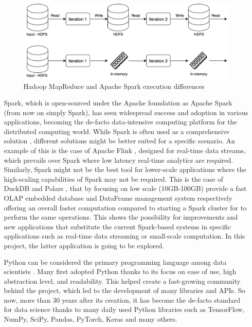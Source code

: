 \begin{figure}[!ht]
    \begin{center}
      \includegraphics[width=\textwidth]{figures/1-introduction/Spark_MapReduce.png}
    \end{center}
    \caption{Hadoop MapReduce and Apache Spark execution differences}
    \label{fig:MapReducevsSpark}
\end{figure}


Spark, which is open-sourced under the Apache foundation as Apache Spark \cite{ApacheSparkUnified} (from now on simply Spark), has seen widespread success and adoption in various applications, becoming the de-facto data-intensive computing platform for the distributed computing world. While Spark is often used as a comprehensive solution \cite{zahariaApacheSparkUnified2016}, different solutions might be better suited for a specific scenario. An example of this is the case of Apache Flink \cite{carboneApacheFlinkStream}, designed for real-time data streams, which prevails over Spark where low latency real-time analytics are required. Similarly, Spark might not be the best tool for lower-scale applications where the high-scaling capabilities of Spark may not be required. This is the case of DuckDB \cite{raasveldtDuckDBEmbeddableAnalytical2019} and Polars \cite{vinkWroteOneFastest2021}, that by focusing on low scale (10GB-100GB) provide a fast \gls{OLAP} embedded database and DataFrame management system respectively offering an overall faster computation compared to starting a Spark cluster for to perform the same operations. This shows the possibility for improvements and new applications that substitute the current Spark-based systems in specific applications such as real-time data streaming or small-scale computation. In this project, the latter application is going to be explored.

Python can be considered the primary programming language among data scientists \cite{Python_CS-R9526}. Many first adopted Python thanks to its focus on ease of use, high abstraction level, and readability. This helped create a fast-growing community behind the project, which led to the development of many libraries and \glspl{API}. So now, more than 30 years after its creation, it has become the de-facto standard for data science thanks to many daily used Python libraries such as TensorFlow, NumPy, SciPy, Pandas, PyTorch, Keras and many others.

